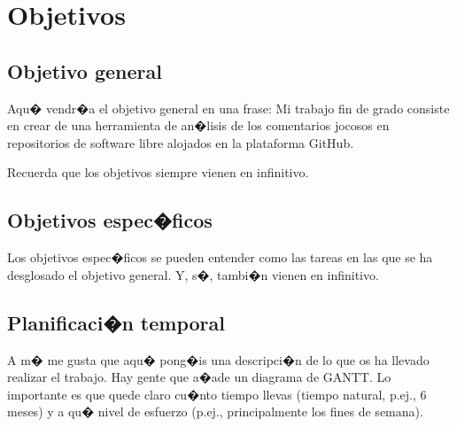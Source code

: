 \documentclass[a4paper, 12pt]{book}
\begin{document}

\cleardoublepage %
\chapter{Objetivos} %
\label{chap:objetivos} %

\section{Objetivo general} %
\label{sec:objetivo-general} %

Aqu� vendr�a el objetivo general en una frase:
Mi trabajo fin de grado consiste en crear de una herramienta de an�lisis de los comentarios jocosos en repositorios de software libre alojados en la plataforma GitHub.

Recuerda que los objetivos siempre vienen en infinitivo.


\section{Objetivos espec�ficos}
\label{sec:objetivos-especificos}

Los objetivos espec�ficos se pueden entender como las tareas en las que se ha desglosado el objetivo general.
Y, s�, tambi�n vienen en infinitivo.


\section{Planificaci�n temporal}
\label{sec:planificacion-temporal}

A m� me gusta que aqu� pong�is una descripci�n de lo que os ha llevado realizar el trabajo.
Hay gente que a�ade un diagrama de GANTT.
Lo importante es que quede claro cu�nto tiempo llevas (tiempo natural, p.ej., 6 meses) y a qu� nivel de esfuerzo (p.ej., principalmente los fines de semana).


\end{document}
